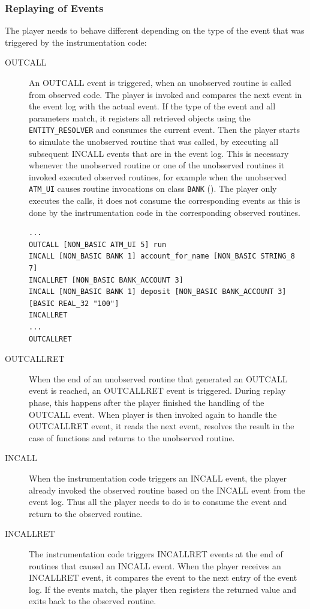 \subsubsection{Replaying of Events}
The player needs to behave different depending on the type of the event that was triggered by the instrumentation code:
\begin{description}
\item[OUTCALL] An OUTCALL event is triggered, when an unobserved routine is called from observed code. The player is invoked and compares the next event in the event log with the actual event. If the type of the event and all parameters match, it registers all retrieved objects using the \texttt{ENTITY\_RESOLVER} and consumes the current event. Then the player starts to simulate the unobserved routine that was called, by executing all subsequent INCALL events that are in the event log. This is necessary whenever the unobserved routine or one of the unobserved routines it invoked executed observed routines, for example when the unobserved \texttt{ATM\_UI} causes routine invocations on class \texttt{BANK} ().  The player only executes the calls, it does not consume the corresponding events as this is done by the instrumentation code in the corresponding observed routines.
\begin{lstlisting}[caption=Example Event Log that Requires Simulation of the Unobserved Routine,label=lst:eventlog_unobserved_simulation]
...
OUTCALL [NON_BASIC ATM_UI 5] run
INCALL [NON_BASIC BANK 1] account_for_name [NON_BASIC STRING_8 7]
INCALLRET [NON_BASIC BANK_ACCOUNT 3]
INCALL [NON_BASIC BANK 1] deposit [NON_BASIC BANK_ACCOUNT 3] [BASIC REAL_32 "100"]
INCALLRET
...
OUTCALLRET
\end{lstlisting}
\item[OUTCALLRET] When the end of an unobserved routine that generated an OUTCALL event is reached, an OUTCALLRET event is triggered. During replay phase, this happens after the player finished the handling of the OUTCALL event. When player is then invoked again to handle the OUTCALLRET event, it reads the next event, resolves the result in the case of functions and returns to the unobserved routine.
\item[INCALL] When the instrumentation code triggers an INCALL event, the player already invoked the observed routine based on the INCALL event from the event log. Thus all the player needs to do is to consume the event and return to the observed routine.
\item[INCALLRET] The instrumentation code triggers INCALLRET events at the end of routines that caused an INCALL event. When the player receives an INCALLRET event, it compares the event to the next entry of the event log. If the events match, the player then registers the returned value and exits back to the observed routine.
\end{description}






